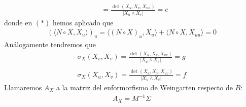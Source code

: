 \begin{ejercicio}
\begin{enumerate}
\begin{align*}
            &= \frac{\det(X_u, X_v, X_{uu})}{|X_u \wedge X_v|} = e
        \end{align*}
        donde en $(\ast)$ hemos aplicado que 
        \begin{gather*}
            (\langle N \circ X, X_u \rangle)_u = \langle (N \circ X)_u, X_u \rangle + \langle N \circ X, X_{uu} \rangle = 0
        \end{gather*}
        Análogamente tendremos que 
        \begin{gather*}
            \sigma_X(X_v, X_v) = \frac{\det(X_u, X_v, X_{vv})}{|X_u \wedge X_v|} = g\\\\
            \sigma_X(X_u, X_v) = \frac{\det(X_u, X_v, X_{uv})}{|X_u \wedge X_v|} = f
        \end{gather*}
        Llamaremos $A_X$ a la matriz del enformorfismo de Weingarten respecto de $B$:
        \begin{gather*}
            A_X = M^{-1}\Sigma
        \end{gather*}
    \end{enumerate}
\end{ejercicio}


